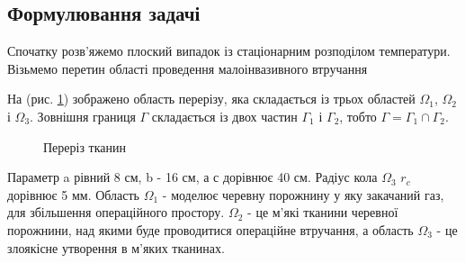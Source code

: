 \subsection{Формулювання задачі}

Спочатку розв'яжемо плоский випадок із стаціонарним розподілом температури.
Візьмемо перетин області проведення малоінвазивного втручання

На (рис. \ref{fig:thermo_2d_domain}) зображено область перерізу, яка складається із трьох областей $\Omega_1$, 
$\Omega_2$ і $\Omega_3$. Зовнішня границя $\Gamma$ складається із двох частин $\Gamma_1$ і $\Gamma_2$, тобто 
$\Gamma=\Gamma_1\cap\Gamma_2$. 

\begin{figure}[ht!]
    \centering
    
    \caption{Переріз тканин}
    \label{fig:thermo_2d_domain}
\end{figure}

\noindent Параметр a рівний 8 см, b - 16 см, а с дорівнює 40 см. Радіус кола $\Omega_3$ $r_c$ дорівнює 5 мм. Область 
$\Omega_1$ - моделює черевну порожнину у яку закачаний газ, для збільшення операційного простору. $\Omega_2$ - це 
м'які тканини черевної порожнини, над якими буде проводитися операційне втручання, а область $\Omega_3$ - це злоякісне
утворення в м'яких тканинах.

